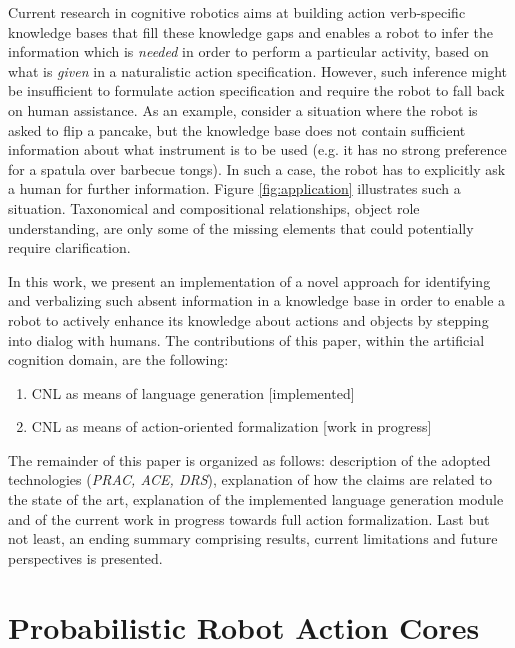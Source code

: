 \documentclass[oribibl]{llncs}
\begin{document}
Current research in cognitive robotics aims at building action 
verb-specific knowledge bases that fill these knowledge gaps and 
enables a robot to infer the information which is \textit{needed} in 
order to perform a particular activity, based on what is \textit 
{given} in a naturalistic action specification. However, such 
inference might be insufficient to formulate action specification and require 
the robot to fall back on human assistance. As an example, consider a situation where 
the robot is asked to flip a pancake, but the knowledge base does 
not contain sufficient information about what instrument is to be used 
(e.g. it has no strong preference for a spatula over barbecue 
tongs). In such a case, the robot has to explicitly ask a human for 
further information. Figure \ref{fig:application} illustrates such a 
situation. Taxonomical and compositional relationships, object role 
understanding, are only some of the missing elements that could 
potentially require clarification. 

In this work, we present an implementation of a novel approach for 
identifying and verbalizing such absent information in a knowledge
 base in order to enable a robot to actively enhance its knowledge
  about actions and objects by stepping into dialog with humans.
The contributions of this paper, within the artificial cognition domain,
 are the following:
\begin{enumerate}
    \item CNL as means of language generation \hfill [implemented]
    \item CNL as means of action-oriented formalization \hfill [work in progress]
\end{enumerate}
The remainder of this paper is organized as follows: 
description of the adopted technologies (\textit{PRAC, ACE, DRS}), 
explanation of how the claims are related to the state of the art, 
explanation of the implemented language generation module and of the current work
 in progress towards full action formalization. Last but not least, 
 an ending summary comprising results, current limitations and future perspectives is presented.

\section{Probabilistic Robot Action Cores}
\end{document}
